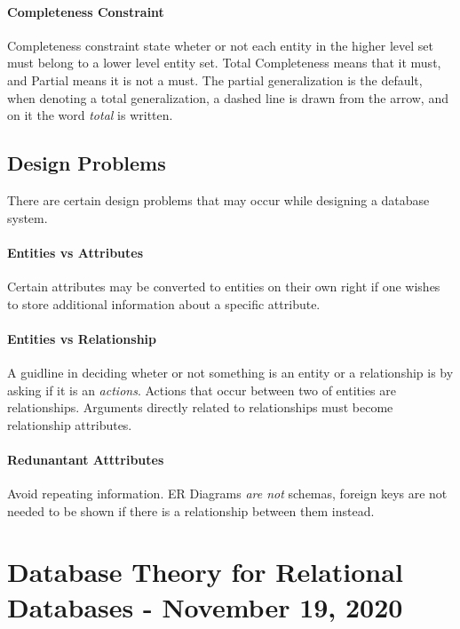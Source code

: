\documentclass[11pt,a4paper,twocolumn]{book}
\begin{document}
\subsubsection{Completeness Constraint}

Completeness constraint state wheter or not each entity in the higher level set must belong to a lower level entity set. Total Completeness means that it must, and Partial means it is not a must. The partial generalization is the default, when denoting a total generalization, a dashed line is drawn from the arrow, and on it the word \textit{total} is written.

\section{Design Problems}

There are certain design problems that may occur while designing a database system.

\subsubsection{Entities vs Attributes}

Certain attributes may be converted to entities on their own right if one wishes to store additional information about a specific attribute.

\subsubsection{Entities vs Relationship}

A guidline in deciding wheter or not something is an entity or a relationship is by asking if it is an \textit{actions}. Actions that occur between two of entities are relationships. Arguments directly related to relationships must become relationship attributes.

\subsubsection{Redunantant Atttributes}

Avoid repeating information. ER Diagrams \textit{are not} schemas, foreign keys are not needed to be shown if there is a relationship between them instead.

\chapter{Database Theory for Relational Databases - November 19, 2020}
\end{document}
